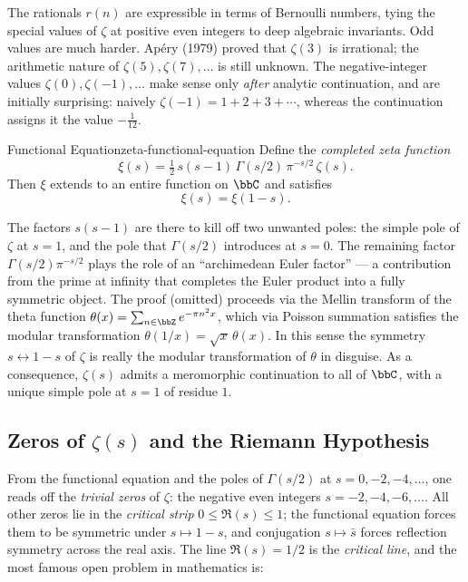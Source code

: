 The rationals $r(n)$ are expressible in terms of Bernoulli numbers, tying the special values of $\zeta$ at positive even integers to deep algebraic invariants. Odd values are much harder. Ap\'ery (1979) proved that $\zeta(3)$ is irrational; the arithmetic nature of $\zeta(5),\zeta(7),\ldots$ is still unknown. The negative-integer values $\zeta(0),\zeta(-1),\ldots$ make sense only \emph{after} analytic continuation, and are initially surprising: naively $\zeta(-1)=1+2+3+\cdots$, whereas the continuation assigns it the value $-\tfrac{1}{12}$.

\begin{Theorem}{Functional Equation}{zeta-functional-equation}
  Define the \emph{completed zeta function}
  $$\xi(s)=\tfrac{1}{2}\,s(s-1)\,\Gamma(s/2)\,\pi^{-s/2}\,\zeta(s).$$
  Then $\xi$ extends to an entire function on $\bbC$ and satisfies
  $$\xi(s)=\xi(1-s).$$
\end{Theorem}

The factors $s(s-1)$ are there to kill off two unwanted poles: the simple pole of $\zeta$ at $s=1$, and the pole that $\Gamma(s/2)$ introduces at $s=0$. The remaining factor $\Gamma(s/2)\pi^{-s/2}$ plays the role of an ``archimedean Euler factor'' --- a contribution from the prime at infinity that completes the Euler product into a fully symmetric object. The proof (omitted) proceeds via the Mellin transform of the theta function $\theta(x)=\sum_{n\in\bbZ}e^{-\pi n^2 x}$, which via Poisson summation satisfies the modular transformation $\theta(1/x)=\sqrt{x}\,\theta(x)$. In this sense the symmetry $s\leftrightarrow 1-s$ of $\zeta$ is really the modular transformation of $\theta$ in disguise. As a consequence, $\zeta(s)$ admits a meromorphic continuation to all of $\bbC$, with a unique simple pole at $s=1$ of residue $1$.

\subsection{Zeros of \texorpdfstring{$\zeta(s)$}{zeta(s)} and the Riemann Hypothesis}
From the functional equation and the poles of $\Gamma(s/2)$ at $s=0,-2,-4,\ldots$, one reads off the \emph{trivial zeros} of $\zeta$: the negative even integers $s=-2,-4,-6,\ldots$. All other zeros lie in the \emph{critical strip} $0\leq\Re(s)\leq 1$; the functional equation forces them to be symmetric under $s\mapsto 1-s$, and conjugation $s\mapsto\bar s$ forces reflection symmetry across the real axis. The line $\Re(s)=1/2$ is the \emph{critical line}, and the most famous open problem in mathematics is:

